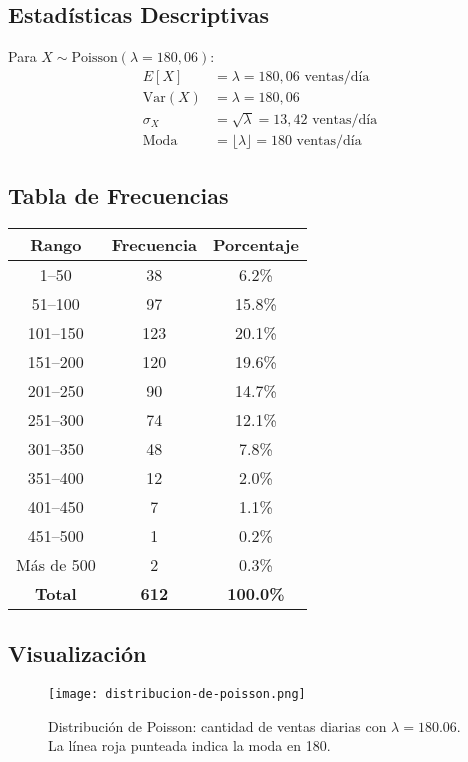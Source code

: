 \documentclass[12pt,a4paper,twoside]{article}
\begin{document}
\newpage

\subsection{Estadísticas Descriptivas}
\vspace{-1em}
Para $X \sim \text{Poisson}(\lambda = 180{,}06)$:
\vspace{-0.5em}
\begin{align}
E[X] &= \lambda = 180{,}06 \text{ ventas/día} \\
\text{Var}(X) &= \lambda = 180{,}06 \\
\sigma_X &= \sqrt{\lambda} = 13{,}42 \text{ ventas/día} \\
\text{Moda} &= \lfloor \lambda \rfloor = 180 \text{ ventas/día}
\end{align}

\vspace{-1.5em}
\subsection{Tabla de Frecuencias}
\vspace{-0.5em}
\begin{table}[H]
\centering
\footnotesize %
\begin{tabular}{|c|c|c|}
\hline
\textbf{Rango} & \textbf{Frecuencia} & \textbf{Porcentaje} \\
\hline
1--50 & 38 & 6.2\% \\
51--100 & 97 & 15.8\% \\
101--150 & 123 & 20.1\% \\
151--200 & 120 & 19.6\% \\
201--250 & 90 & 14.7\% \\
251--300 & 74 & 12.1\% \\
301--350 & 48 & 7.8\% \\
351--400 & 12 & 2.0\% \\
401--450 & 7 & 1.1\% \\
451--500 & 1 & 0.2\% \\
Más de 500 & 2 & 0.3\% \\
\hline
\textbf{Total} & \textbf{612} & \textbf{100.0\%} \\
\hline
\end{tabular}
\end{table}
\vspace{-1em}


\subsection{Visualización}
\begin{figure}[H]
\centering
\texttt{[image: distribucion-de-poisson.png]}
\caption{Distribución de Poisson: cantidad de ventas diarias con $\lambda = 180.06$. La línea roja punteada indica la moda en 180.}
\label{fig:poisson-distribucion}
\end{figure}
\end{document}
